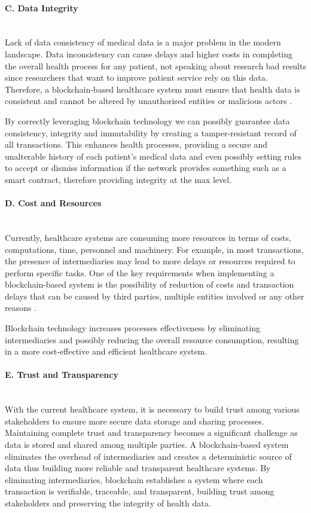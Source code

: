 \paragraph{C. Data Integrity} \mbox{}\\
Lack of data consistency of medical data is a major problem in the modern landscape. Data inconsistency can cause delays and higher 
costs in completing the overall health process for any patient, not speaking about research bad results since researchers that 
want to improve patient service rely on this data. Therefore, a blockchain-based healthcare system must ensure that health data 
is consistent and cannot be altered by unauthorised entities or malicious actors \cite{blockchain-utilization-in-healthcare}.

By correctly leveraging blockchain technology we can possibly guarantee data consistency, integrity and immutability by creating a 
tamper-resistant record of all transactions. This enhances health processes, providing a secure and unalterable history of each 
patient's medical data and even possibly setting rules to accept or dismiss information if the network provides something such 
as a smart contract, therefore providing integrity at the max level.

\paragraph{D. Cost and Resources} \mbox{}\\
Currently, healthcare systems are consuming more resources in terms of costs, computations, time, personnel and machinery. 
For example, in most transactions, the presence of intermediaries may lead to more delays or resources required to perform 
specific tasks. One of the key requirements when implementing a blockchain-based system is the possibility of reduction of costs and 
transaction delays that can be caused by third parties, multiple entities involved or any other reasons \cite{blockchain-utilization-in-healthcare}.

Blockchain technology increases processes effectiveness by eliminating intermediaries and possibly reducing the overall 
resource consumption, resulting in a more cost-effective and efficient healthcare system.
\paragraph{E. Trust and Transparency} \mbox{}\\
With the current healthcare system, it is necessary to build trust among various stakeholders to ensure more secure data 
storage and sharing processes. Maintaining complete trust and transparency becomes a significant challenge as data is stored 
and shared among multiple parties. A blockchain-based system eliminates the overhead of intermediaries and creates a deterministic 
source of data thus building more reliable and transparent healthcare systems.
By eliminating intermediaries, blockchain establishes a system where each transaction is verifiable, traceable, and transparent, 
building trust among stakeholders and preserving the integrity of health data.

